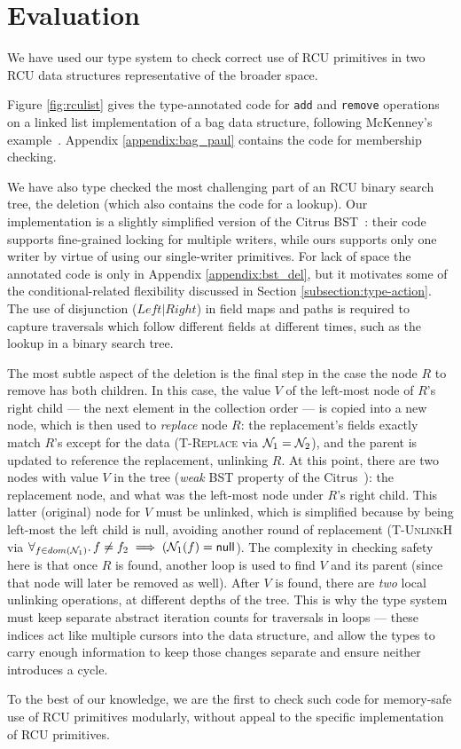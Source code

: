 \makeatletter %
\def\arcr{\@arraycr}
\makeatother
\section{Evaluation}
\label{sec:eval}
We have used our type system to check correct use of RCU primitives in two RCU data structures representative of the broader space.

Figure \ref{fig:rculist} gives the type-annotated code for \lstinline|add| and \lstinline|remove| operations on a linked list implementation of a bag data structure, following McKenney's example~\cite{McKenney2015SomeEO}.
Appendix \ref{appendix:bag_paul} contains the code for membership checking.

We have also type checked the most challenging part of an RCU binary search tree, the deletion (which also contains the code for a lookup).
Our implementation is a slightly simplified version of the Citrus BST~\cite{Arbel:2014:CUR:2611462.2611471}: their code supports fine-grained locking for multiple writers, while ours supports only one writer by virtue of using our single-writer primitives.
For lack of space the annotated code is only in Appendix \ref{appendix:bst_del}, but it motivates some of the conditional-related flexibility discussed in Section \ref{subsection:type-action}.
The use of disjunction ($Left|Right$) in field maps and paths is required to capture traversals which follow different fields at different times, such as the lookup in a binary search tree.

The most subtle aspect of the deletion is the final step in the case the node $R$ to remove has both children.  In this case, the value $V$ of the left-most node of $R$'s right child --- the next element in the collection order --- is copied into a new node, which is then used to \emph{replace} node $R$: the replacement's fields exactly match $R$'s except for the data (\textsc{T-Replace} via $\mathcal{N}_1 = \mathcal{N}_2$), and the parent is updated to reference the replacement, unlinking $R$.  At this point, there are two nodes with value $V$ in the tree (\textit{weak} BST property of the Citrus~\cite{Arbel:2014:CUR:2611462.2611471}): the replacement node, and what was the left-most node under $R$'s right child. This latter (original) node for $V$ must be unlinked, which is simplified because by being left-most the left child is null, avoiding another round of replacement (\textsc{T-UnlinkH} via $\forall_{f\in dom(\mathcal{N}_1)} \ldotp f\neq f_2 \implies (\mathcal{N}_1(f) = \textsf{null}$).
The complexity in checking safety here is that once $R$ is found, another loop is used to find $V$ and its parent (since that node will later be removed as well).
After $V$ is found, there are \emph{two} local unlinking operations, at different depths of the tree.  This is why the type system must keep separate abstract iteration counts for traversals in loops --- these indices act like multiple cursors into the data structure, and allow the types to carry enough information to keep those changes separate and ensure neither introduces a cycle.

To the best of our knowledge, we are the first to check such code for memory-safe use of RCU primitives modularly, without appeal to the specific implementation of RCU primitives.

